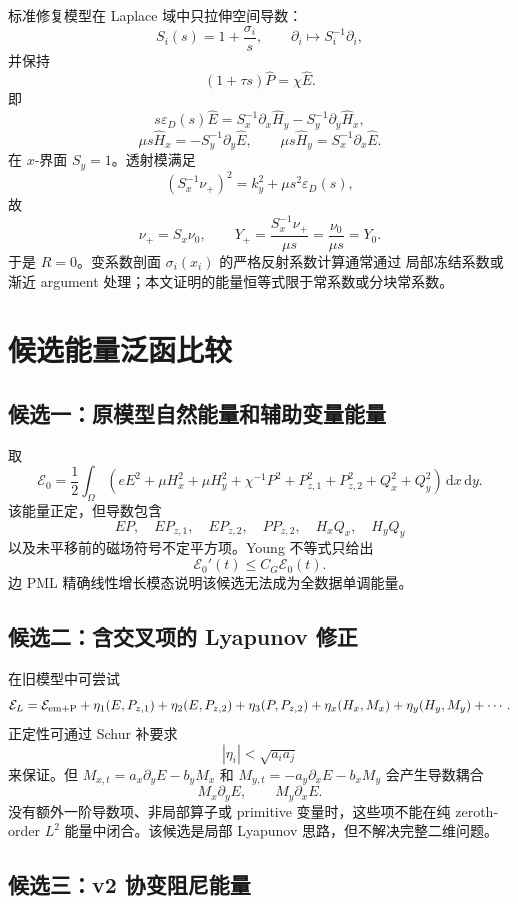 \documentclass[UTF8,a4paper,11pt]{ctexart}
\newcommand{\dd}{\,\mathrm d}
\newcommand{\Om}{\Omega}
\newcommand{\Ecal}{\mathcal E}
\begin{document}
标准修复模型在 Laplace 域中只拉伸空间导数：
\[
S_i(s)=1+\frac{\sigma_i}{s},\qquad
\partial_i\mapsto S_i^{-1}\partial_i,
\]
并保持
\[
(1+\tau s)\widehat P=\chi\widehat E.
\]
即
\begin{equation}
\boxed{
s\varepsilon_D(s)\widehat E
=S_x^{-1}\partial_x\widehat H_y
-S_y^{-1}\partial_y\widehat H_x,}
\label{eq:sc-pml-E}
\end{equation}
\[
\boxed{
\mu s\widehat H_x=-S_y^{-1}\partial_y\widehat E,\qquad
\mu s\widehat H_y=S_x^{-1}\partial_x\widehat E.}
\]
在 \(x\)-界面 \(S_y=1\)。透射模满足
\[
(S_x^{-1}\nu_+)^2=k_y^2+\mu s^2\varepsilon_D(s),
\]
故
\[
\nu_+=S_x\nu_0,\qquad
Y_+=\frac{S_x^{-1}\nu_+}{\mu s}
=\frac{\nu_0}{\mu s}=Y_0.
\]
于是 \(R=0\)。变系数剖面 \(\sigma_i(x_i)\) 的严格反射系数计算通常通过
局部冻结系数或渐近 argument 处理；本文证明的能量恒等式限于常系数或分块常系数。

\section{候选能量泛函比较}

\subsection{候选一：原模型自然能量和辅助变量能量}

取
\[
\Ecal_0=\frac12\int_\Om
\left(eE^2+\mu H_x^2+\mu H_y^2+\chi^{-1}P^2
+P_{z,1}^2+P_{z,2}^2+Q_x^2+Q_y^2\right)\dd x\dd y .
\]
该能量正定，但导数包含
\[
EP,\quad EP_{z,1},\quad EP_{z,2},\quad PP_{z,2},\quad
H_xQ_x,\quad H_yQ_y
\]
以及未平移前的磁场符号不定平方项。Young 不等式只给出
\[
\Ecal_0'(t)\le C_G\Ecal_0(t).
\]
边 PML 精确线性增长模态说明该候选无法成为全数据单调能量。

\subsection{候选二：含交叉项的 Lyapunov 修正}

在旧模型中可尝试
\[
\Ecal_L=\Ecal_{\rm em+P}
+\eta_1(E,P_{z,1})+\eta_2(E,P_{z,2})
+\eta_3(P,P_{z,2})+\eta_x(H_x,M_x)+\eta_y(H_y,M_y)
+\cdots .
\]
正定性可通过 Schur 补要求
\[
|\eta_i|<\sqrt{a_i a_j}
\]
来保证。但 \(M_{x,t}=a_x\partial_yE-b_yM_x\) 和
\(M_{y,t}=-a_y\partial_xE-b_xM_y\) 会产生导数耦合
\[
M_x\partial_yE,\qquad M_y\partial_xE.
\]
没有额外一阶导数项、非局部算子或 primitive 变量时，这些项不能在纯
zeroth-order \(L^2\) 能量中闭合。该候选是局部 Lyapunov 思路，但不解决完整二维问题。

\subsection{候选三：v2 协变阻尼能量}
\end{document}

